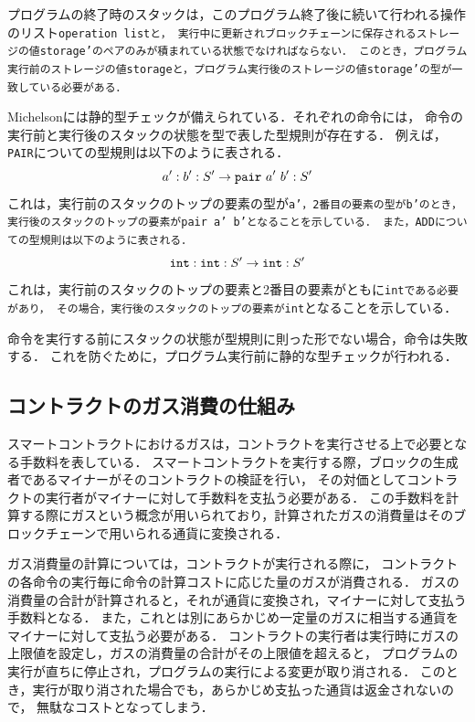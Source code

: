 \documentclass{kuisthesis}
\begin{document}
プログラムの終了時のスタックは，このプログラム終了後に続いて行われる操作のリスト{\tt operation listと，
実行中に更新されブロックチェーンに保存されるストレージの値storage'のペアのみが積まれている状態でなければならない．
このとき，プログラム実行前のストレージの値storageと，プログラム実行後のストレージの値storage'の型が一致している必要がある．}

Michelsonには静的型チェックが備えられている．それぞれの命令には，
命令の実行前と実行後のスタックの状態を型で表した型規則が存在する．
例えば，{\tt PAIR}についての型規則は以下のように表される．
\begin{displaymath}
  a' : b' : S' \rightarrow {\tt pair}\ a'\ b' : S'
\end{displaymath}
これは，実行前のスタックのトップの要素の型が{\tt a'，2番目の要素の型がb'のとき，
実行後のスタックのトップの要素がpair a' b'となることを示している．
また，ADDについての型規則は以下のように表される．}
\begin{displaymath}
  {\tt int : int} : S' \rightarrow {\tt int} : S'
\end{displaymath}
これは，実行前のスタックのトップの要素と2番目の要素がともに{\tt intである必要があり，
その場合，実行後のスタックのトップの要素がint}となることを示している．

命令を実行する前にスタックの状態が型規則に則った形でない場合，命令は失敗する．
これを防ぐために，プログラム実行前に静的な型チェックが行われる．

\subsection{コントラクトのガス消費の仕組み}\label{subsec-pre-gas}
スマートコントラクトにおけるガスは，コントラクトを実行させる上で必要となる手数料を表している．
スマートコントラクトを実行する際，ブロックの生成者であるマイナーがそのコントラクトの検証を行い，
その対価としてコントラクトの実行者がマイナーに対して手数料を支払う必要がある．
この手数料を計算する際にガスという概念が用いられており，計算されたガスの消費量はそのブロックチェーンで用いられる通貨に変換される．


ガス消費量の計算については，コントラクトが実行される際に，
コントラクトの各命令の実行毎に命令の計算コストに応じた量のガスが消費される．
ガスの消費量の合計が計算されると，それが通貨に変換され，マイナーに対して支払う手数料となる．
また，これとは別にあらかじめ一定量のガスに相当する通貨をマイナーに対して支払う必要がある．
コントラクトの実行者は実行時にガスの上限値を設定し，ガスの消費量の合計がその上限値を超えると，
プログラムの実行が直ちに停止され，プログラムの実行による変更が取り消される．
このとき，実行が取り消された場合でも，あらかじめ支払った通貨は返金されないので，
無駄なコストとなってしまう．
\end{document}
